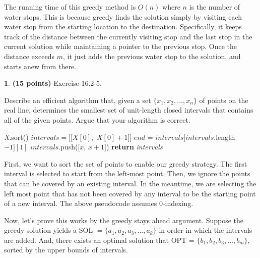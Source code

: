 \documentclass[11pt]{article}
\theoremstyle{definition}
\theoremstyle{theorem}
\newtheorem{prob}{}
\newcommand{\solution}{\medskip\noindent{\color{DarkBlue}\textbf{Solution:}}}
\begin{document}
The running time of this greedy method is $O(n)$ where $n$ is the number of water stops. This is because greedy finds the solution simply by visiting each water stop from the starting location to the destination. Specifically, it keeps track of the distance between the currently visiting stop and the last stop in the current solution while maintaining a pointer to the previous stop. Once the distance exceeds $m$, it just adds the previous water stop to the solution, and starts anew from there.

\newpage
\begin{prob} \textbf{(15 points)} Exercise 16.2-5.
\end{prob}
Describe an efficient algorithm that, given a set $\{ x_1, x_2, ..., x_n \}$ of points on the real line, determines the smallest set of unit-length closed intervals that contains all of the given points. Argue that your algorithm is correct.

\solution

\begin{algorithmic}[1]
 
	\State \textit{X}.sort() 
	\State $\textit{intervals} = [[X[0],$ $X[0] + 1]]$ 
		\State $\textit{end}$ = $\textit{intervals}[\textit{intervals}$.length $- 1][1]$
		 
			\State $\textit{intervals}$.push($[x$, $x + 1]$)
		\EndIf
	\EndFor
	\State \textbf{return} \textit{intervals}
\EndFunction
\end{algorithmic}

First, we want to sort the set of points to enable our greedy strategy. The first interval is selected to start from the left-most point. Then, we ignore the points that can be covered by an existing interval. In the meantime, we are selecting the left most point that has not been covered by any interval to be the starting point of a new interval. The above pseudocode assumes 0-indexing.

Now, let's prove this works by the greedy stays ahead argument. Suppose the greedy solution yields a SOL $= \{a_1, a_2, a_3, ..., a_k\}$ in order in which the intervals are added. And, there exists an optimal solution that OPT = $\{b_1, b_2, b_3, ..., b_m\}$, sorted by the upper bounds of intervals. 
\end{document}
